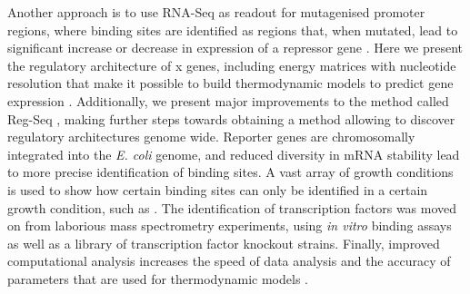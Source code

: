 Another approach is to use RNA-Seq as readout for mutagenised promoter regions, where binding sites are identified as regions that, when mutated, lead to significant increase or decrease in expression of a repressor gene \cite{urtecho2018systematic, urtecho2020genome, ireland2020deciphering}. Here we present the regulatory architecture of x  genes, including energy matrices with nucleotide resolution that make it possible to build thermodynamic models to predict gene expression \cite{kinney2010using,belliveau2018systematic,barnes2019mapping,ireland2020deciphering}. Additionally, we present major improvements to the method called Reg-Seq \cite{ireland2020deciphering}, making further steps towards obtaining a method allowing to discover regulatory architectures genome wide. Reporter genes are chromosomally integrated into the \textit{E. coli} genome, and reduced diversity in mRNA stability lead to more precise identification of binding sites. A vast array of growth conditions is used to show how certain binding sites can only be identified in a certain growth condition, such as . The identification of transcription factors was moved on from laborious mass spectrometry experiments, using \textit{in vitro} binding assays as well as a library of transcription factor knockout strains. Finally, improved computational analysis increases the speed of data analysis and the accuracy of parameters that are used for thermodynamic models .


